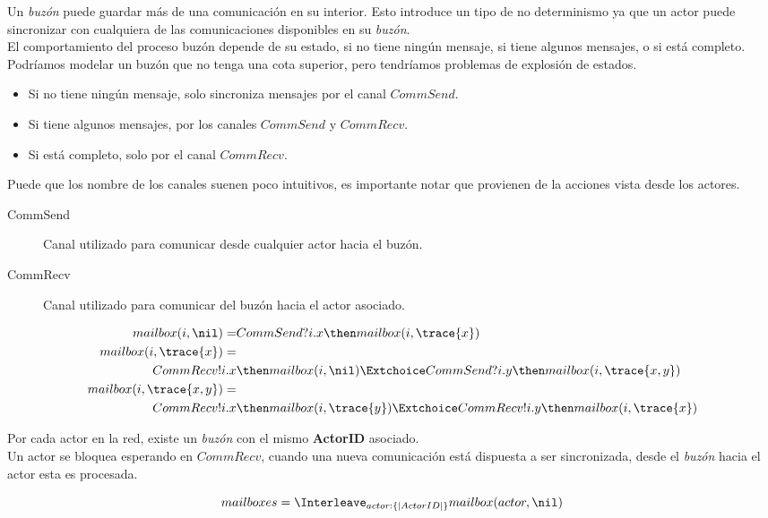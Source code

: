 Un \textit{buzón} puede guardar más de una comunicación en su interior. Esto introduce un tipo de no determinismo ya que un actor puede sincronizar con cualquiera de las comunicaciones disponibles en su \textit{buzón}.\\
El comportamiento del proceso buzón depende de su estado, si no tiene ningún mensaje, si tiene algunos mensajes, o si está completo. Podríamos modelar un buzón que no tenga una cota superior, pero tendríamos problemas de explosión de estados.

\begin{itemize}
\item Si no tiene ningún mensaje, solo sincroniza mensajes por el canal $CommSend$.
\item Si tiene algunos mensajes, por los canales $CommSend$ y $CommRecv$.
\item Si está completo, solo por el canal $CommRecv$.
\end{itemize}

Puede que los nombre de los canales suenen poco intuitivos, es importante notar que provienen de la acciones vista desde los actores.

\begin{description}
\item [CommSend] Canal utilizado para comunicar desde cualquier actor hacia el buzón.
\item [CommRecv] Canal utilizado para comunicar del buzón hacia el actor asociado.
\end{description}

\begin{align*}
mailbox(i, \nil) =& CommSend?i.x \then mailbox(i, \trace{x}) \\
mailbox(i, \trace{x}) =& \\
CommRecv!i.x & \then mailbox(i, \nil) \Extchoice CommSend?i.y \then mailbox(i, \trace{x, y}) \\
mailbox(i, \trace{x, y}) =& \\
CommRecv!i.x & \then mailbox(i,\trace{y}) \Extchoice CommRecv!i.y \then mailbox(i, \trace{x}) 
\end{align*}

Por cada actor en la red, existe un \textit{buzón} con el mismo \textbf{ActorID}
asociado. \\ 
Un actor se bloquea esperando en $CommRecv$, cuando una nueva comunicación está
dispuesta a ser sincronizada, desde el \textit{buzón} hacia el actor esta es procesada.

\[
mailboxes  = \Interleave_{actor : \{| ActorID |\} } mailbox(actor, \nil) 
\]

